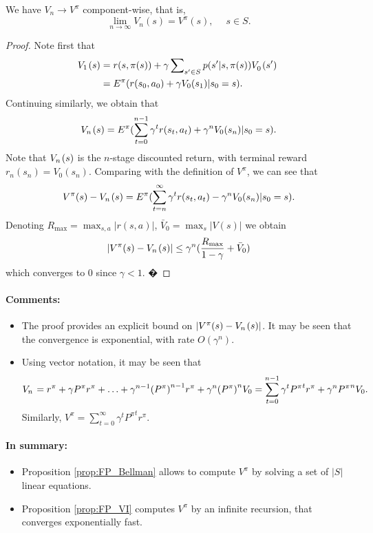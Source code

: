 \begin{proposition}\label{prop:FP_VI}
We have ${V_n} \to V_{}^\pi$ component-wise, that is,
\[{\lim _{n \to \infty }}{V_n}(s) = V_{}^\pi (s),\quad \;s \in S.\]
\end{proposition}
\begin{proof}
Note first that
\begin{align*}
{V_1}{\kern 1pt} (s) &= r(s,\pi (s)) + \gamma \sum\nolimits_{s' \in S} {p(s'|s,\pi (s))V_0^{}{\kern 1pt} (s')} \;\\
 &= {E^\pi }(r({s_0},{a_0}) + \gamma {V_0}({s_1})|{s_0} = s).
\end{align*}
Continuing similarly, we obtain that
\[{V_n}{\kern 1pt} (s) = {E^\pi }(\sum\limits_{t = 0}^{n - 1} {{\gamma ^t}r({s_t},{a_t})}  + {\gamma ^n}{V_0}({s_n})|{s_0} = s).\]
Note that ${V_n}{\kern 1pt} (s)$ is the $n$-stage discounted return, with terminal reward ${r_n}({s_n}) = {V_0}({s_n})$. Comparing with the definition of $V_{}^\pi $, we can see that
\[{V^\pi }(s) - {V_n}{\kern 1pt} (s) = {E^\pi }(\sum\limits_{t = n}^\infty  {{\gamma ^t}r({s_t},{a_t})}  - {\gamma ^n}{V_0}({s_n})|{s_0} = s).\]
Denoting ${R_{\max }} = {\max _{s,a}}|r(s,a)|$, ${\bar V_0} = {\max _s}|V(s)|$ we obtain
\[|{V^\pi }(s) - {V_n}{\kern 1pt} (s)| \le {\gamma ^n}(\frac{{{R_{\max }}}}{{1 - \gamma }} + {\bar V_0})\]
which converges to 0 since $\gamma  < 1$.                                                                                    �
\end{proof}

\paragraph{Comments:}
\begin{itemize}
  \item The proof provides an explicit bound on $|{V^\pi }(s) - {V_n}{\kern 1pt} (s)|$. It may be seen that the convergence is exponential, with rate $O({\gamma ^n})$.
  \item Using vector notation, it may be seen that
          \[{V_n}{\kern 1pt}  = {r^\pi } + \gamma{P^\pi}{r^\pi } +  \ldots  + \gamma^{n-1}{{(P^\pi)}^{n - 1}}{r^\pi } + \gamma^{n}{{(P^\pi)}^n}{V_0} = \sum\limits_{t = 0}^{n - 1} {\gamma^t{{P^\pi}^t}{r^\pi}}  + {\gamma^n{P^\pi}^n}{V_0}.\]
Similarly,    ${V^\pi } = \sum\limits_{t = 0}^\infty  {\gamma^t{{P^\pi }^t}{r^\pi }}$.
\end{itemize}

\paragraph{In summary:}
\begin{itemize}
  \item Proposition \ref{prop:FP_Bellman} allows to compute $V_{}^\pi $ by solving a set of $|S|$ linear equations.
  \item Proposition \ref{prop:FP_VI} computes $V_{}^\pi $ by an infinite recursion, that converges exponentially fast.
\end{itemize}

